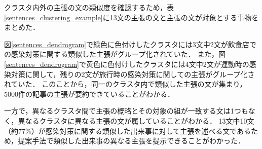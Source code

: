 \documentclass[12pt,a4j,dvipdfmx]{jreport}
\begin{document}
クラスタ内外の主張の文の類似度を確認するため，表\ref{sentences_clustering_example}に13文の主張の文と主張の文が対象とする事物をまとめた．

図\ref{sentences_dendrogram}で緑色に色付けしたクラスタには3文中2文が飲食店での感染対策に関する類似した主張がグループ化されていた．
また，図\ref{sentences_dendrogram}で黄色に色付けしたクラスタには4文中2文が運動時の感染対策に関して，残りの2文が旅行時の感染対策に関しての主張がグループ化されていた．
このことから，同一のクラスタ内で類似した主張の文が集まり，5000件の記事の主張が要約できていることがわかる．

一方で，異なるクラスタ間で主張の概略とその対象の組が一致する文は1つもなく，異なるクラスタに異なる主張の文が属していることがわかる．
13文中10文（約77\%）が感染対策に関する類似した出来事に対して主張を述べる文であるため，提案手法で類似した出来事の異なる主張を提示できることがわかった．
\end{document}
